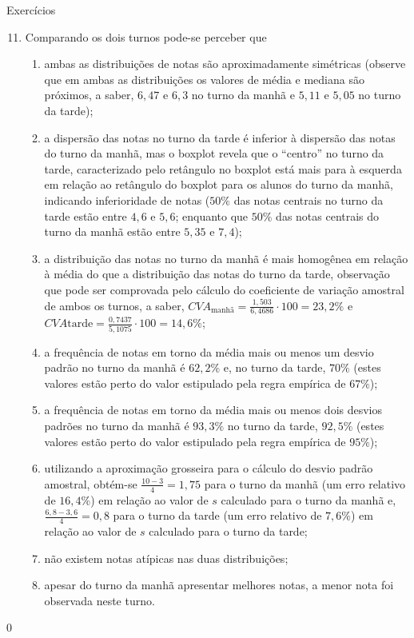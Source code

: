 \begin{answer}{Exercícios}
{\exerciselist
  \begin{enumerate}\setcounter{enumi}{10}
  \item  Comparando os dois turnos pode-se perceber que
  \begin{enumerate}
  \item ambas as distribuições de notas são aproximadamente simétricas (observe que em ambas as distribuições os valores de média e mediana são próximos, a saber, $6{,}47$ e $6{,}3$ no turno da manhã e $5{,}11$ e $5{,}05$ no turno da tarde);
  \item a dispersão das notas no turno da tarde é inferior à dispersão das notas do turno da manhã, mas o boxplot revela que o “centro”{} no turno da tarde, caracterizado pelo retângulo no boxplot está mais para à esquerda em relação ao retângulo do boxplot para os alunos do turno da manhã, indicando inferioridade de notas ($50\%$ das notas centrais no turno da tarde estão entre $4{,}6$ e $5{,}6$; enquanto que $50\%$ das notas centrais do turno da manhã estão entre $5{,}35$ e $7{,}4$);
  \item a distribuição das notas no turno da manhã é mais homogênea em relação à média do que a distribuição das notas do turno da tarde, observação que pode ser comprovada pelo cálculo do coeficiente de variação amostral de ambos os turnos, a saber, $CVA_{\text{manhã}}=\frac{1{,}503}{6{,}4686}\cdot100=23{,}2\%$ e $CVA{\text{tarde}}=\frac{0{,}7437}{5{,}1075}\cdot100=14{,}6\%$;
  \item a frequência de notas em torno da média mais ou menos um desvio padrão no turno da manhã é $62{,}2\%$ e, no turno da tarde, $70\%$ (estes valores estão perto do valor estipulado pela regra empírica de $67\%$);
  \item a frequência de notas em torno da média mais ou menos dois desvios padrões no turno da manhã é $93{,}3\%$ no turno da tarde, $92{,}5\%$ (estes valores estão perto do valor estipulado pela regra empírica de $95\%$);
  \item utilizando a aproximação grosseira para o cálculo do desvio padrão amostral, obtém-se $\frac{10-3}{4}=1{,}75$ para o turno da manhã (um erro relativo de $16{,}4\%$) em relação ao valor de $s$ calculado para o turno da manhã e, $\frac{6{,}8-3{,}6}{4}=0{,}8$ para o turno da tarde (um erro relativo de $7{,}6\%$) em relação ao valor de $s$ calculado para o turno da tarde;
  \item não existem notas atípicas nas duas distribuições;
  \item apesar do turno da manhã apresentar melhores notas, a menor nota foi observada neste turno.
  \end{enumerate}
  \end{enumerate}
}{0}
\end{answer}
\clearmargin

